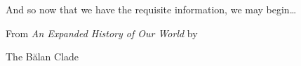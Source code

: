  And so now that we have the requisite information, we may begin\ldots{}

  \vspace{1em}
  
  From \emph{An Expanded History of Our World} by

  The Bălan Clade

  \vfill



